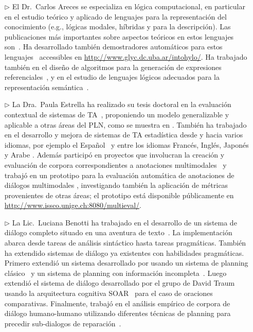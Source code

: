\begin{itemize}

\item[$\triangleright$] El Dr.\ Carlos Areces se especializa en l\'ogica computacional,
en particular en el estudio te\'orico y aplicado de lenguajes para la
representaci\'on del conocimiento (e.g., l\'ogicas modales, h\'ibridas y
para la descripci\'on).  Las publicaciones
m\'as importantes sobre aspectos te\'oricos en estos lenguajes
son~\citep{ABM01,arec:hybr05b}.  Ha desarrollado tambi\'en demostradores
autom\'aticos para estos lenguajes~\citep{ANR01,arec:hylo02a,AG06,Hoffmann2007}
accessibles en \url{http://www.glyc.dc.uba.ar/intohylo/}.
Ha trabajado tambi\'en en el dise\~no de algoritmos para la generaci\'on de
expresiones referenciales~\citep{AKS08}, y en el estudio de lenguajes l\'ogicos
adecuados para la representaci\'on sem\'antica~\citep{AF08}.

\item[$\triangleright$] La Dra.\ Paula Estrella ha realizado su tesis doctoral en la 
evaluaci\'on contextual de sistemas de TA~\citep{estr:impr08, estr:femt09}, proponiendo 
un modelo generalizable y aplicable a otras \'areas del PLN, como se muestra en 
\citep{Miller2008}. Tambi\'en ha trabajado en el desarrollo y mejora de sistemas de TA 
estad\'istica desde y hacia varios idiomas, por ejemplo el Espa\~nol~\citep{estr:expe05} 
y entre los idiomas Franc\'es, Ingl\'es, Japon\'es y Arabe \citep{rayner-EtAl:2009:GEAF}. 
Adem\'as particip\'o en proyectos que involucran la creaci\'on y evaluaci\'on de corpora 
correspondientes a anotaciones multimodales~\citep{pope:estr07} y trabaj\'o en un prototipo 
para la evaluaci\'on autom\'atica de anotaciones de di\'alogos multimodales \citep{multieval}, 
investigando tambi\'en la aplicaci\'on de m\'etricas provenientes de otras \'areas; el 
prototipo est\'a disponible p\'ublicamente en \url{http://www.issco.unige.ch:8080/multieval/}.


\item[$\triangleright$] La Lic.\ Luciana Benotti ha trabajado en el desarrollo de un sistema de
di\'alogo completo situado en una aventura de
texto~\citep{benotti09b}. La implementaci\'on abarca desde tareas de an\'alisis
sint\'actico hasta tareas pragm\'aticas. Tambi\'en ha extendido sistemas de
di\'alogo ya existentes con habilidades pragm\'aticas. Primero extendi\'o un
sistema desarrollado por \cite{koller04} usando un sistema de
planning cl\'asico~\citep{benotti07} y un sistema de planning con informaci\'on
incompleta~\citep{benotti08}. Luego extendi\'o el sistema de di\'alogo
desarrollado por el grupo de David Traum usando la arquitectura cognitiva
SOAR~\citep{benotti09a} para el caso de oraciones comparativas. Finalmente,
trabaj\'o en el an\'alisis emp\'irico de corpora de di\'alogo humano-humano utilizando
diferentes t\'ecnicas de planning para precedir sub-dialogos de reparaci\'on~\citep{benotti09c}.

\end{itemize}

